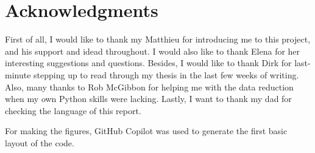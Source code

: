 \section{Acknowledgments}
First of all, I would like to thank my Matthieu for introducing me to this project, and his support and idead throughout. I would also like to thank Elena for her interesting suggestions and questions. Besides, I would like to thank Dirk for last-minute stepping up to read through my thesis in the last few weeks of writing. Also, many thanks to Rob McGibbon for helping me with the data reduction when my own Python skills were lacking. Lastly, I want to thank my dad for checking the language of this report. \par 
For making the figures, GitHub Copilot was used to generate the first basic layout of the code.  









